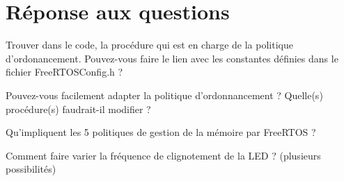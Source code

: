 \section{Réponse aux questions}


Trouver dans le code, la procédure qui est en charge de la politique d’ordonancement.
Pouvez-vous faire le lien avec les constantes définies dans le fichier
FreeRTOSConfig.h ?


Pouvez-vous facilement adapter la politique d’ordonnancement ? Quelle(s) procédure(s)
faudrait-il modifier ?


Qu’impliquent les 5 politiques de gestion de la mémoire par FreeRTOS ?


Comment faire varier la fréquence de clignotement de la LED ? (plusieurs possibilités)
